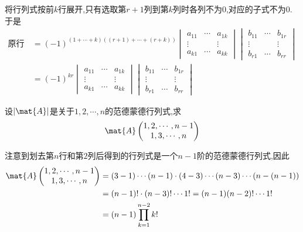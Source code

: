 \documentclass{ctexart}
\begin{document}
\begin{solution}
    将行列式按前$k$行展开,只有选取第$r+1$列到第$k$列时各列不为$0$,对应的子式不为$0$.于是
    \[\begin{aligned}
        \text{原行列式}
        &= (-1)^{(1+\cdots+k)((r+1)+\cdots+(r+k))}\begin{vmatrix}
                a_{11}&\cdots&a_{1k}\\
                \vdots& &\vdots\\
                a_{k1}&\cdots&a_{kk}
            \end{vmatrix}\begin{vmatrix}
                b_{11}&\cdots&b_{1r}\\
                \vdots& &\vdots\\
                b_{r1}&\cdots&b_{rr}
            \end{vmatrix}\\
        &= (-1)^{kr}\begin{vmatrix}
                a_{11}&\cdots&a_{1k}\\
                \vdots& &\vdots\\
                a_{k1}&\cdots&a_{kk}
            \end{vmatrix}\begin{vmatrix}
                b_{11}&\cdots&b_{1r}\\
                \vdots& &\vdots\\
                b_{r1}&\cdots&b_{rr}
            \end{vmatrix}
    \end{aligned}\]
\end{solution}
\begin{homework}[4(2)]
    设$|\mat{A}|$是关于$1,2,\cdots,n$的范德蒙德行列式,求
    \[\mat{A}\begin{pmatrix}
        1,2,\cdots,n-1\\
        1,3,\cdots,n
    \end{pmatrix}\]
\end{homework}
\begin{solution}
    注意到划去第$n$行和第$2$列后得到的行列式是一个$n-1$阶的范德蒙德行列式,因此
    \[\begin{aligned}
        \mat{A}\begin{pmatrix}
            1,2,\cdots,n-1\\
            1,3,\cdots,n
        \end{pmatrix}
        &= (3-1)\cdots(n-1)\cdot(4-3)\cdots(n-3)\cdots(n-(n-1)) \\
        &= (n-1)!\cdot(n-3)!\cdots1! = (n-1)(n-2)!\cdots1! \\
        &= (n-1)\prod_{k=1}^{n-2}k!
    \end{aligned}\]
\end{solution}
\end{document}
